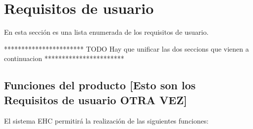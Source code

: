 \chapter{Requisitos de usuario}
	En esta secci\'on es una lista enumerada de los requisitos de usuario.\newline

	***********************\newline
	TODO Hay que unificar las dos seccions que vienen a continuacion\newline
	***********************\newline

\section{Funciones del producto [Esto son los Requisitos de usuario OTRA VEZ]}

	El sistema EHC permitir\'a la realizaci\'on de las siguientes funciones:

